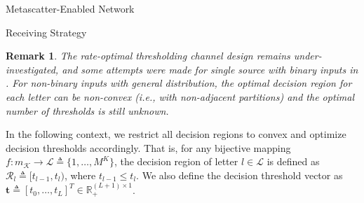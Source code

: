 \documentclass[journal]{IEEEtran}
\newtheorem{remark}{Remark}
\begin{document}
\begin{section}{Metascatter-Enabled Network}
\begin{subsection}{Receiving Strategy}
		\begin{remark}
			The rate-optimal thresholding channel design remains under-investigated, and some attempts were made for single source with binary inputs in \cite{Qian2019b,Nguyen2021b}.
			For non-binary inputs with general distribution, the optimal decision region for each letter can be non-convex (i.e., with non-adjacent partitions) and the optimal number of thresholds is still unknown.
		\end{remark}
		In the following context, we restrict all decision regions to convex and optimize decision thresholds accordingly. That is, for any bijective mapping $f : m_{\mathcal{K}} \to \mathcal{L} \triangleq \{1,\ldots,M^K\}$, the decision region of letter $l \in \mathcal{L}$ is defined as $\mathcal{R}_l \triangleq [t_{l-1},t_l)$, where $t_{l-1} \le t_l$. We also define the decision threshold vector as $\boldsymbol{t} \triangleq [t_0,\ldots,t_L]^T \in \mathbb{R}_+^{(L+1) \times 1}$.
	\end{subsection}


\end{section}
\end{document}
